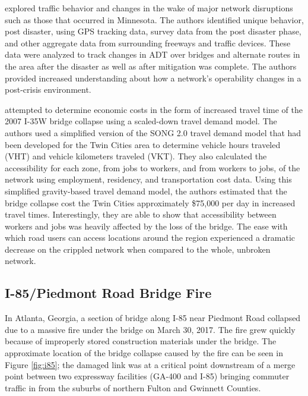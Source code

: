 \citet{levinson2010} explored traffic behavior and changes in the wake of
major network
disruptions such as those that occurred in Minnesota. The authors identified
unique behavior, post
disaster, using GPS tracking data, survey data from the post disaster
phase, and other aggregate
data from surrounding freeways and traffic devices. These data were
analyzed to track
changes in ADT over bridges and alternate routes in the area after the
disaster as well as
after mitigation was complete. The authors provided increased
understanding about how a
network's operability changes in a post-crisis environment.

\citet{xie2011} attempted to determine economic costs in the form of
increased travel time
of the 2007 I-35W bridge collapse using a scaled-down travel demand model.
The authors used a
simplified version of the SONG 2.0 travel demand model that had been
developed for the Twin
Cities area to determine vehicle hours traveled (VHT) and vehicle
kilometers traveled (VKT). They
also calculated the accessibility for each zone, from jobs to workers, and
from workers to jobs, of
the network using employment, residency, and transportation cost data.
Using this simplified
gravity-based travel demand model, the authors estimated that the bridge collapse cost the Twin
Cities approximately
\$75,000 per day in increased travel times. Interestingly, they are able to
show that accessibility between workers and jobs was heavily affected by the
loss of the bridge. The ease with which road users can access locations around the region
experienced a dramatic decrease on the crippled network when compared to the whole, unbroken network.

\subsection{I-85/Piedmont Road Bridge Fire}

In Atlanta, Georgia, a section of bridge along I-85 near Piedmont Road collapsed due to a
massive fire under the bridge
on March 30, 2017. The fire grew
quickly because of
improperly stored construction materials under the bridge. The approximate
location of the bridge
collapse caused by the fire can be seen in Figure \ref{fig:i85}; the damaged link was
at a critical point
downstream of a merge point between two expressway facilities (GA-400 and
I-85) bringing commuter
traffic in from the suburbs of northern Fulton and Gwinnett Counties.

